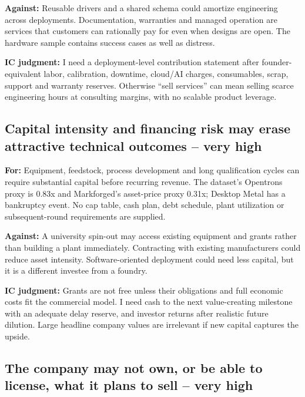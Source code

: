 \textbf{Against:} Reusable drivers and a shared schema could amortize
engineering across deployments. Documentation, warranties and managed
operation are services that customers can rationally pay for even when
designs are open. The hardware sample contains success cases as well as
distress.

\textbf{IC judgment:} I need a deployment-level contribution statement
after founder-equivalent labor, calibration, downtime, cloud/AI charges,
consumables, scrap, support and warranty reserves. Otherwise ``sell
services'' can mean selling scarce engineering hours at consulting
margins, with no scalable product leverage.

\subsection{Capital intensity and financing risk may erase attractive
technical outcomes -- very
high}\label{capital-intensity-and-financing-risk-may-erase-attractive-technical-outcomes-very-high}

\textbf{For:} Equipment, feedstock, process development and long
qualification cycles can require substantial capital before recurring
revenue. The dataset's Opentrons proxy is 0.83x and Markforged's
asset-price proxy 0.31x; Desktop Metal has a bankruptcy event. No cap
table, cash plan, debt schedule, plant utilization or subsequent-round
requirements are supplied. \citep{InputData}

\textbf{Against:} A university spin-out may access existing equipment
and grants rather than building a plant immediately. Contracting with
existing manufacturers could reduce asset intensity. Software-oriented
deployment could need less capital, but it is a different investee from
a foundry.

\textbf{IC judgment:} Grants are not free unless their obligations and
full economic costs fit the commercial model. I need cash to the next
value-creating milestone with an adequate delay reserve, and investor
returns after realistic future dilution. Large headline company values
are irrelevant if new capital captures the upside.

\subsection{The company may not own, or be able to license, what it
plans to sell -- very
high}\label{the-company-may-not-own-or-be-able-to-license-what-it-plans-to-sell-very-high}

